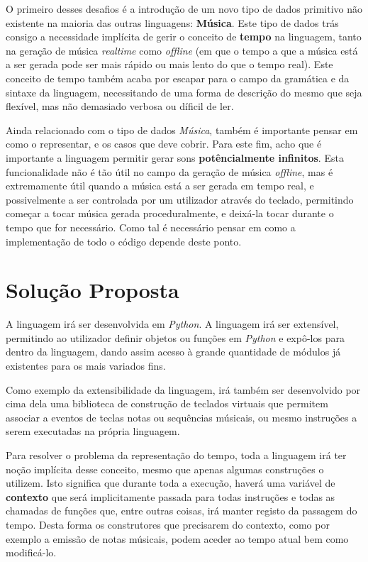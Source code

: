\documentclass[
  oneside,
  11pt, a4paper,
  footinclude=true,
  headinclude=true,
  cleardoublepage=empty
]{scrbook}
\begin{document}
    O primeiro desses desafios é a introdução de um novo tipo de dados primitivo não existente na maioria das outras linguagens: \textbf{Música}. Este tipo de dados trás consigo a necessidade implícita de gerir o conceito de \textbf{tempo} na linguagem, tanto na geração de música \textit{realtime} como \textit{offline} (em que o tempo a que a música está a ser gerada pode ser mais rápido ou mais lento do que o tempo real). Este conceito de tempo também acaba por escapar para o campo da gramática e da sintaxe da linguagem, necessitando de uma forma de descrição do mesmo que seja flexível, mas não demasiado verbosa ou díficil de ler.
    
    Ainda relacionado com o tipo de dados \textit{Música}, também é importante pensar em como o representar, e os casos que deve cobrir. Para este fim, acho que é importante a linguagem permitir gerar sons \textbf{potêncialmente infinitos}. Esta funcionalidade não é tão útil no campo da geração de música \textit{offline}, mas é extremamente útil quando a música está a ser gerada em tempo real, e possivelmente a ser controlada por um utilizador através do teclado, permitindo começar a tocar música gerada proceduralmente, e deixá-la tocar durante o tempo que for necessário. Como tal é necessário pensar em como a implementação de todo o código depende deste ponto.

	\section{Solução Proposta}
	A linguagem irá ser desenvolvida em \textit{Python}. A linguagem irá ser extensível, permitindo ao utilizador definir objetos ou funções em \textit{Python} e expô-los para dentro da linguagem, dando assim acesso à grande quantidade de módulos já existentes para os mais variados fins.
	
	Como exemplo da extensibilidade da linguagem, irá também ser desenvolvido por cima dela uma biblioteca de construção de teclados virtuais que permitem associar a eventos de teclas notas ou sequências músicais, ou mesmo instruções a serem executadas na própria linguagem.
	
	Para resolver o problema da representação do tempo, toda a linguagem irá ter noção implícita desse conceito, mesmo que apenas algumas construções o utilizem. Isto significa que durante toda a execução, haverá uma variável de \textbf{contexto} que será implicitamente passada para todas instruções e todas as chamadas de funções que, entre outras coisas, irá manter registo da passagem do tempo. Desta forma os construtores que precisarem do contexto, como por exemplo a emissão de notas músicais, podem aceder ao tempo atual bem como modificá-lo.
	
\end{document}
